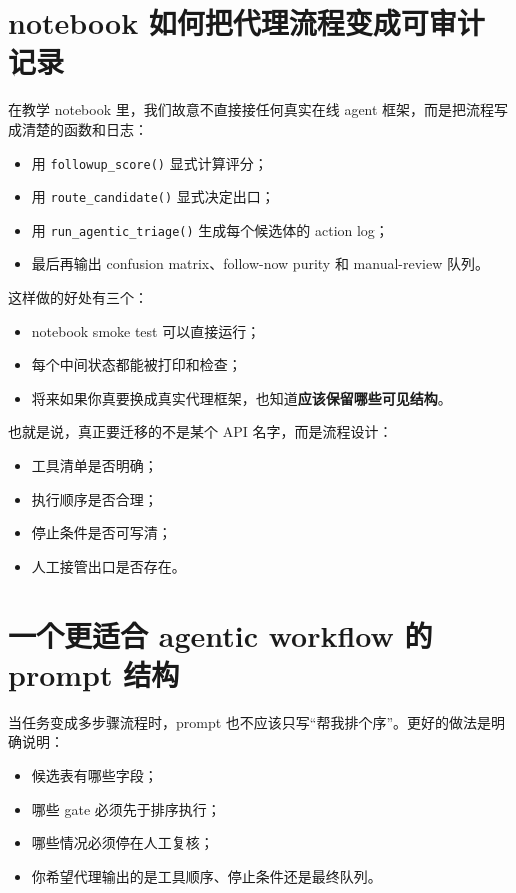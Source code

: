 \section{notebook 如何把代理流程变成可审计记录}

在教学 notebook 里，我们故意不直接接任何真实在线 agent 框架，而是把流程写成清楚的函数和日志：

\begin{itemize}
    \item 用 \texttt{followup\_score()} 显式计算评分；
    \item 用 \texttt{route\_candidate()} 显式决定出口；
    \item 用 \texttt{run\_agentic\_triage()} 生成每个候选体的 action log；
    \item 最后再输出 confusion matrix、follow-now purity 和 manual-review 队列。
\end{itemize}

这样做的好处有三个：

\begin{itemize}
    \item notebook smoke test 可以直接运行；
    \item 每个中间状态都能被打印和检查；
    \item 将来如果你真要换成真实代理框架，也知道\textbf{应该保留哪些可见结构}。
\end{itemize}

也就是说，真正要迁移的不是某个 API 名字，而是流程设计：

\begin{itemize}
    \item 工具清单是否明确；
    \item 执行顺序是否合理；
    \item 停止条件是否可写清；
    \item 人工接管出口是否存在。
\end{itemize}

\section{一个更适合 agentic workflow 的 prompt 结构}

当任务变成多步骤流程时，prompt 也不应该只写“帮我排个序”。更好的做法是明确说明：

\begin{itemize}
    \item 候选表有哪些字段；
    \item 哪些 gate 必须先于排序执行；
    \item 哪些情况必须停在人工复核；
    \item 你希望代理输出的是工具顺序、停止条件还是最终队列。
\end{itemize}

